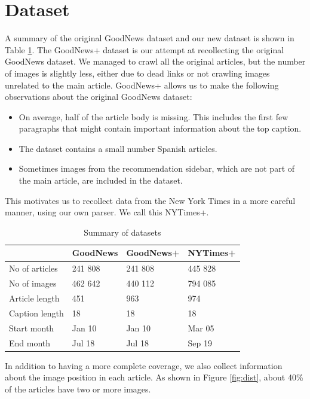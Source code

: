 \documentclass[10pt,twocolumn,letterpaper]{article}
\begin{document}
\section{Dataset}

A summary of the original GoodNews dataset and our new dataset is shown in
Table \ref{tab:datasets}. The GoodNews+ dataset is our attempt at recollecting
the original GoodNews dataset. We managed to crawl all the original articles,
but the number of images is slightly less, either due to dead links or
not crawling images unrelated to the main article. GoodNews+ allows us to make the
following observations about the original GoodNews dataset:

\begin{itemize}
   \item On average, half of the article body is missing. This includes
         the first few paragraphs that might contain important information
         about the top caption.
   \item The dataset contains a small number Spanish articles.
   \item Sometimes images from the recommendation sidebar, which are not part
         of the main article, are included in the dataset.
\end{itemize}

This motivates us to recollect data from the New York Times in a more careful
manner, using our own parser. We call this NYTimes+.

\begin{table}[t]
	\caption {Summary of datasets}
	\label{tab:datasets}
	\centering
	\begin{tabular}{llll}
		\toprule
		  & GoodNews  & GoodNews+ &   NYTimes+ \\
		\midrule
      No of articles & 241 808 & 241 808 & 445 828 \\
      No of images   & 462 642 & 440 112 & 794 085 \\
      Article length & 451 & 963 & 974 \\
      Caption length & 18 & 18 & 18 \\
      Start month & Jan 10 & Jan 10 & Mar 05\\
      End month & Jul 18 & Jul 18 & Sep 19 \\
		\bottomrule
	\end{tabular}
\end{table}

In addition to having a more complete coverage, we also collect information
about the image position in each article. As shown in Figure \ref{fig:dist},
about 40\% of the articles have two or more images.
\end{document}

